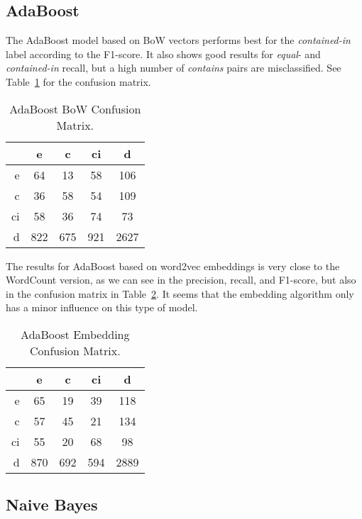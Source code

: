 \subsection{AdaBoost}

The AdaBoost model based on  BoW vectors performs best for the \emph{contained-in} label according to the F1-score.
It also shows good results for \emph{equal}- and \emph{contained-in} recall, but a high number of \emph{contains} pairs are misclassified.
See Table~\ref{tab:adaboost-cm} for the confusion matrix.

\begin{table}[htbp]
 \begin{center}
  \begin{tabular}{r|cccc}
   & e & c & ci & d \\
   \hline
   e & 64 & 13 & 58 & 106 \\
   c & 36 & 58 & 54 & 109 \\
   ci & 58 & 36 & 74 & 73 \\
   d & 822 & 675  & 921 & 2627 \\
  \end{tabular}
  \caption{AdaBoost BoW Confusion Matrix.}
  \label{tab:adaboost-cm}
 \end{center}
\end{table}

The results for AdaBoost based on word2vec embeddings is very close to the WordCount version, as we can see in the precision,
recall, and F1-score, but also in the confusion matrix in Table~\ref{tab:adaboost-emb-cm}.
It seems that the embedding algorithm only has a minor influence on this type of model.

\begin{table}[htbp]
 \begin{center}
  \begin{tabular}{r|cccc}
   & e & c & ci & d \\
   \hline
   e & 65 & 19 & 39 & 118 \\
   c & 57 & 45 & 21 & 134 \\
   ci & 55 & 20 & 68 & 98 \\
   d & 870 & 692 & 594 & 2889 \\
  \end{tabular}
  \caption{AdaBoost Embedding Confusion Matrix.}
  \label{tab:adaboost-emb-cm}
 \end{center}
\end{table}

\subsection{Naive Bayes}

